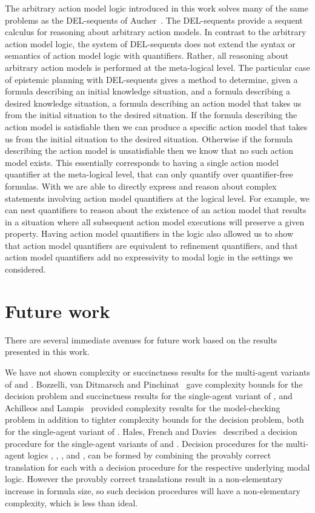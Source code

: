 The arbitrary action model logic introduced in this work solves many of the same problems as the DEL-sequents of Aucher~\cite{aucher:2011,aucher:2012}.
The DEL-sequents provide a sequent calculus for reasoning about arbitrary action models.
In contrast to the arbitrary action model logic, the system of DEL-sequents does not extend the syntax or semantics of action model logic with quantifiers.
Rather, all reasoning about arbitrary action models is performed at the meta-logical level.
The particular case of epistemic planning with DEL-sequents gives a method to determine, given a formula describing an initial knowledge situation, and a formula describing a desired knowledge situation, a formula describing an action model that takes us from the initial situation to the desired situation.
If the formula describing the action model is satisfiable then we can produce a specific action model that takes us from the initial situation to the desired situation.
Otherwise if the formula describing the action model is unsatisfiable then we know that no such action model exists.
This essentially corresponds to having a single action model quantifier at the meta-logical level, that can only quantify over quantifier-free formulas.
With \logicAaml{} we are able to directly express and reason about complex statements involving action model quantifiers at the logical level.
For example, we can nest quantifiers to reason about the existence of an action model that results in a situation where all subsequent action model executions will preserve a given property.
Having action model quantifiers in the logic also allowed us to show that action model quantifiers are equivalent to refinement quantifiers, and that action model quantifiers add no expressivity to modal logic in the settings we considered.

\section{Future work}

There are several immediate avenues for future work based on the results presented in this work.

We have not shown complexity or succinctness results for the multi-agent variants of \logicRml{} and \logicAaml{}.
Bozzelli, van Ditmarsch and Pinchinat~\cite{bozzelli:2014a} gave complexity bounds for the decision problem and succinctness results for the single-agent variant of \logicRmlK{}, and Achilleos and Lampis~\cite{achilleos:2013} provided complexity results for the model-checking problem in addition to tighter complexity bounds for the decision problem, both for the single-agent variant of \logicRmlK{}.
Hales, French and Davies~\cite{hales:2011b} described a decision procedure for the single-agent variants of \logicRmlKD{} and \logicRmlS{}.
Decision procedures for the multi-agent logics \logicRmlK{}, \logicRmlKFF{}, \logicRmlKD{}, and \logicRmlS{}, can be formed by combining the provably correct translation for each with a decision procedure for the respective underlying modal logic.
However the provably correct translations result in a non-elementary increase in formula size, so such decision procedures will have a non-elementary complexity, which is less than ideal.

